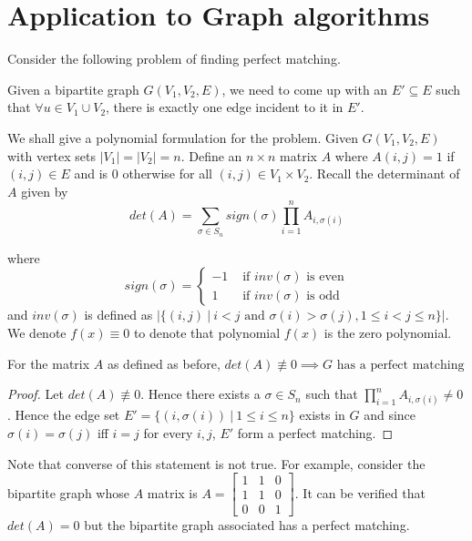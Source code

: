 \noindent

\section{Application to Graph algorithms}
Consider the following problem of finding perfect matching.
\begin{definition}
Given a bipartite graph $G(V_1,V_2, E)$, we need to come up with an $E'
\subseteq E$ such that $\forall u \in V_1 \cup V_2$, there is exactly one edge
incident to it in $E'$.
\end{definition}

We shall give a polynomial formulation for the problem. Given $G(V_1, V_2, E)$
with vertex sets $|V_1| = |V_2| = n$. Define an $n\times n$ matrix $A$ where
$A(i,j) = 1$ if $(i,j) \in E$ and is $0$ otherwise for all $(i,j) \in V_1 \times
V_2$. Recall the determinant of $A$ given
by
\[ det(A) = \sum_{\sigma \in S_n} sign(\sigma) \prod_{i=1}^n A_{i,\sigma(i)}
\]

where \[
sign(\sigma) = \begin{cases} 
	  -1  & \text{ if } inv(\sigma) \text{ is even} \\
	  1 & \text{ if } inv(\sigma) \text{ is odd}
\end{cases}\]
and $inv(\sigma)$ is defined as 
$\left |\{(i,j) ~|~ i < j \text{ and } \sigma(i) > \sigma(j), 1 \le i<j \le n\}
\right |$.
We denote $f(x) \equiv 0$ to denote that polynomial $f(x)$ is the zero
polynomial.
\begin{lemma}
For the matrix $A$ as defined as before, $det(A) \not \equiv 0 \implies
\text{$G$ has a perfect matching}$ \label{lem:det_pm_simple}
\end{lemma}
\begin{proof}
Let $det(A) \not \equiv 0$. Hence there exists a $\sigma \in
S_n$ such that $\prod_{i=1}^n A_{i, \sigma(i)} \ne 0$. Hence the edge set
$E' = \{(i, \sigma(i)) ~|~ 1\le i\le n\}$ exists in $G$ and since $\sigma(i) =
\sigma(j)$ iff $i=j$ for every $i,j$, $E'$ form a perfect matching.

\end{proof}
Note that converse of this statement is not true. For example, consider the
bipartite graph whose $A$ matrix is $A = 
\begin{bmatrix}
		1 & 1 & 0  \\
		1 & 1 & 0  \\
		0 & 0 & 1  
\end{bmatrix}
$. It can be verified that $det(A) = 0$ but the bipartite graph associated has
a perfect matching.

